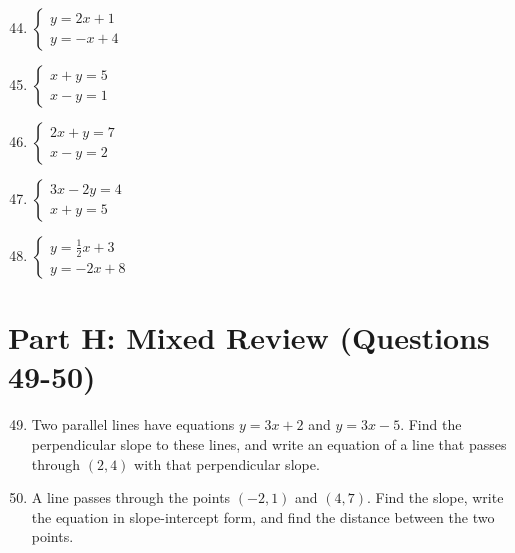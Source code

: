\documentclass[12pt]{article}
\begin{document}
\begin{enumerate}
\setcounter{enumi}{43}

\item $\begin{cases} y = 2x + 1 \\ y = -x + 4 \end{cases}$

\vspace{1.5cm}

\item $\begin{cases} x + y = 5 \\ x - y = 1 \end{cases}$

\vspace{1.5cm}

\item $\begin{cases} 2x + y = 7 \\ x - y = 2 \end{cases}$

\vspace{1.5cm}

\item $\begin{cases} 3x - 2y = 4 \\ x + y = 5 \end{cases}$

\vspace{1.5cm}

\item $\begin{cases} y = \frac{1}{2}x + 3 \\ y = -2x + 8 \end{cases}$

\vspace{1.5cm}

\end{enumerate}

\section*{Part H: Mixed Review (Questions 49-50)}

\begin{enumerate}
\setcounter{enumi}{48}

\item Two parallel lines have equations $y = 3x + 2$ and $y = 3x - 5$. Find the perpendicular slope to these lines, and write an equation of a line that passes through $(2, 4)$ with that perpendicular slope.

\vspace{1.5cm}

\item A line passes through the points $(-2, 1)$ and $(4, 7)$. Find the slope, write the equation in slope-intercept form, and find the distance between the two points.

\vspace{1.5cm}

\end{enumerate}
\end{document}
